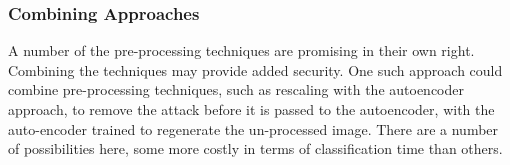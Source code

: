 \subsubsection{Combining Approaches}
A number of the pre-processing techniques are promising in their own right. Combining the techniques may provide added security.  One such approach could combine pre-processing techniques, such as rescaling with the autoencoder approach, to remove the attack before it is passed to the autoencoder, with the auto-encoder trained to regenerate the un-processed image.  There are a number of possibilities here, some more costly in terms of classification time than others.